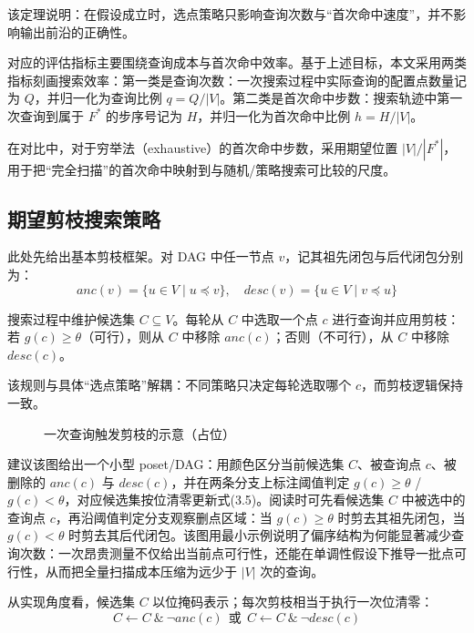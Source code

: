 \documentclass[UTF8,a4paper,12pt,twoside]{ctexart}  %
\begin{document}
该定理说明：在假设成立时，选点策略只影响查询次数与``首次命中速度''，并不影响输出前沿的正确性。

对应的评估指标主要围绕查询成本与首次命中效率。基于上述目标，本文采用两类指标刻画搜索效率：第一类是查询次数：一次搜索过程中实际查询的配置点数量记为
\(Q\)，并归一化为查询比例
\(q=Q/|V|\)。第二类是首次命中步数：搜索轨迹中第一次查询到属于 \(F^*\)
的步序号记为 \(H\)，并归一化为首次命中比例 \(h=H/|V|\)。

在对比中，对于穷举法（exhaustive）的首次命中步数，采用期望位置
\(|V|/|F^*|\)，用于把``完全扫描''的首次命中映射到与随机/策略搜索可比较的尺度。

\subsection{期望剪枝搜索策略}

此处先给出基本剪枝框架。对 DAG 中任一节点 \(v\)，记其祖先闭包与后代闭包分别为：
\begin{equation}
anc(v) = \{u \in V \mid u \preceq v\}, \quad desc(v) = \{u \in V \mid v \preceq u\}
\end{equation}

搜索过程中维护候选集 \(C \subseteq V\)。每轮从 \(C\) 中选取一个点 \(c\)
进行查询并应用剪枝：若 \(g(c)\ge\theta\)（可行），则从 \(C\) 中移除
\(anc(c)\)；否则（不可行），从 \(C\) 中移除 \(desc(c)\)。

该规则与具体``选点策略''解耦：不同策略只决定每轮选取哪个
\(c\)，而剪枝逻辑保持一致。

\begin{figure}[htbp]
  \centering
  \caption{一次查询触发剪枝的示意（占位）}
  \label{fig:single-query-pruning-placeholder}
\end{figure}

建议该图给出一个小型 poset/DAG：用颜色区分当前候选集 \(C\)、被查询点
\(c\)、被删除的 \(anc(c)\) 与 \(desc(c)\)，并在两条分支上标注阈值判定
\(g(c)\ge\theta\) / \(g(c)<\theta\)，对应候选集按位清零更新式(3.5)。阅读时可先看候选集 \(C\) 中被选中的查询点 \(c\)，再沿阈值判定分支观察删点区域：当 \(g(c)\ge\theta\) 时剪去其祖先闭包，当 \(g(c)<\theta\) 时剪去其后代闭包。该图用最小示例说明了偏序结构为何能显著减少查询次数：一次昂贵测量不仅给出当前点可行性，还能在单调性假设下推导一批点可行性，从而把全量扫描成本压缩为远少于 \(|V|\) 次的查询。

从实现角度看，候选集 \(C\) 以位掩码表示；每次剪枝相当于执行一次位清零：
\begin{equation}
C \leftarrow C\ \&\ \neg anc(c)\ \ \text{或}\ \ C \leftarrow C\ \&\ \neg desc(c)
\end{equation}
\end{document}
